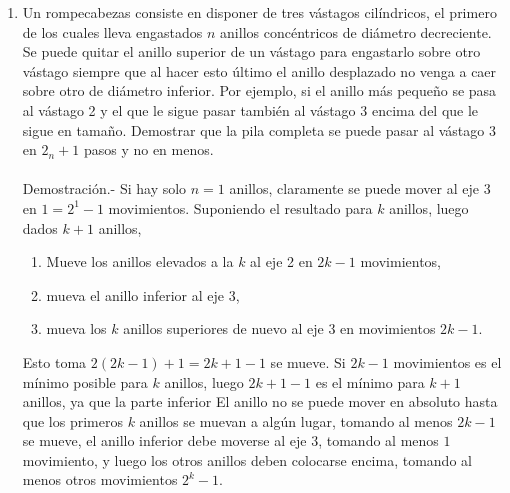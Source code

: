 \begin{enumerate}[\bfseries 1.]
       \item Un rompecabezas consiste en disponer de tres vástagos cilíndricos, el primero de los cuales lleva engastados $n$ anillos concéntricos de diámetro decreciente. Se puede quitar el anillo superior de un vástago para engastarlo sobre otro vástago siempre que al hacer esto último el anillo desplazado no venga a caer sobre otro de diámetro inferior. Por ejemplo, si el anillo más pequeño se pasa al vástago 2 y el que le sigue pasar también al vástago 3 encima del que le sigue en tamaño. Demostrar que la pila completa se puede pasar al vástago 3 en $2_n+1$ pasos  y no en menos.\\\\
          Demostración.-\; Si hay solo $n=1$ anillos, claramente se puede mover al eje $3$ en $1=2^1 - 1$ movimientos. Suponiendo el resultado para $k$ anillos, luego dados $k+1$ anillos,
	  \begin{enumerate}[\bfseries (a)]
	  	\item Mueve los anillos elevados a la $k$ al eje 2 en $2k-1$ movimientos,
		\item mueva el anillo inferior al eje 3,
		\item mueva los $k$ anillos superiores de nuevo al eje $3$ en movimientos $2k-1$.
	  \end{enumerate}
	Esto toma $2(2k - 1) + 1 = 2k + 1 - 1$ se mueve. Si $2k - 1$ movimientos es el mínimo posible para $k$ anillos, luego $2k + 1- 1$ es el mínimo para $k + 1$ anillos, ya que la parte inferior El anillo no se puede mover en absoluto hasta que los primeros $k$ anillos se muevan a algún lugar, tomando al menos $2k - 1$ se mueve, el anillo inferior debe moverse al eje $3$, tomando al menos $1$ movimiento, y luego los otros anillos deben colocarse encima, tomando al menos otros movimientos $2^k  - 1$.\\\\


\end{enumerate}
